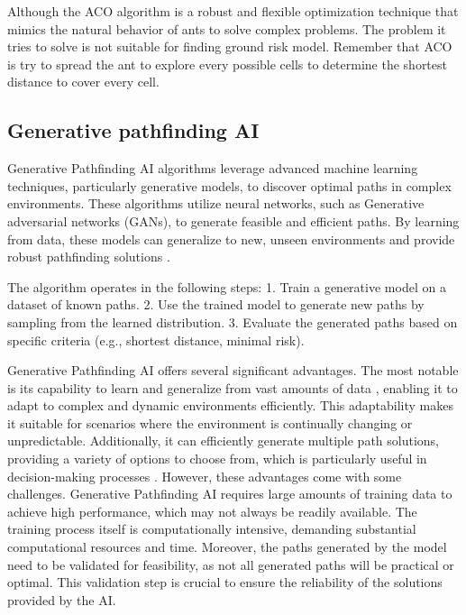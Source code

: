 \documentclass[12pt]{report}
\begin{document}
        Although the ACO algorithm is a robust and flexible optimization technique that mimics the natural behavior of
        ants to solve complex problems. The problem it tries to solve is not suitable for finding ground risk model.
        Remember that ACO is try to spread the ant to explore every possible cells to determine the shortest distance to
        cover every cell.
        

        \subsection{Generative pathfinding AI}
        Generative Pathfinding AI algorithms leverage advanced machine learning techniques, particularly generative
        models, to discover optimal paths in complex environments. These algorithms utilize neural networks, such as
        Generative adversarial networks (GANs), to generate feasible and efficient paths. By learning from data, these
        models can generalize to new, unseen environments and provide robust pathfinding solutions
        \cite{silver_mastering_2016}.
            
        The algorithm operates in the following steps: 1. Train a generative model on a dataset of known paths. 2. Use
        the trained model to generate new paths by sampling from the learned distribution. 3. Evaluate the generated
        paths based on specific criteria (e.g., shortest distance, minimal risk).
            
        Generative Pathfinding AI offers several significant advantages. The most notable is its capability to learn and
        generalize from vast amounts of data \cite{russell_artificial_2010}, enabling it to adapt to complex and dynamic
        environments efficiently. This adaptability makes it suitable for scenarios where the environment is continually
        changing or unpredictable. Additionally, it can efficiently generate multiple path solutions, providing a
        variety of options to choose from, which is particularly useful in decision-making processes
        \cite{russell_artificial_2010}. However, these advantages come with some challenges. Generative Pathfinding AI
        requires large amounts of training data to achieve high performance, which may not always be readily available.
        The training process itself is computationally intensive, demanding substantial computational resources and
        time. Moreover, the paths generated by the model need to be validated for feasibility, as not all generated
        paths will be practical or optimal. This validation step is crucial to ensure the reliability of the solutions
        provided by the AI.
        
\end{document}
